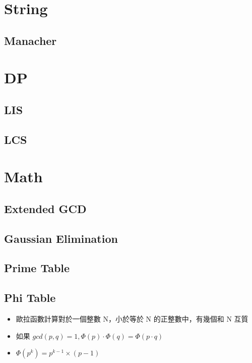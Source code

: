 \section{String}
    \subsection{Manacher}
        

\section{DP}
    \subsection{LIS}
        
    \subsection{LCS}
        

\section{Math}
    \subsection{Extended GCD}
        
    \subsection{Gaussian Elimination}
        
    \subsection{Prime Table}
        
    \subsection{Phi Table}
        \begin{itemize}
            \item 歐拉函數計算對於一個整數 N，小於等於 N 的正整數中，有幾個和 N 互質
            \item 如果 $gcd(p, q) = 1, \Phi(p) \cdot \Phi(q) = \Phi(p \cdot q)$
            \item $\Phi(p^k) = p^{k - 1} \times (p - 1)$
        \end{itemize}
        

